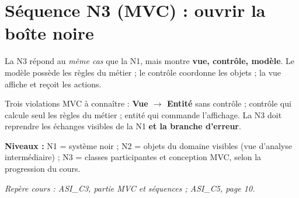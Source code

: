 \documentclass[10pt,a4paper]{article}
\newcommand{\source}[1]{\par{\footnotesize\color{bodygray}\textit{Repère cours : #1}}}
\begin{document}
\section{Séquence N3 (MVC) : ouvrir la boîte noire}
La N3 répond au \emph{même cas} que la N1, mais montre \textbf{vue, contrôle, modèle}. Le modèle possède les règles du métier ; le contrôle coordonne les objets ; la vue affiche et reçoit les actions.
\begin{center}
\end{center}
\begin{warningbox}
Trois violations MVC à connaître : \textbf{Vue \(\rightarrow\) Entité} sans contrôle ; contrôle qui calcule seul les règles du métier ; entité qui commande l'affichage. La N3 doit reprendre les échanges visibles de la N1 \textbf{et la branche d'erreur}.
\end{warningbox}
\textbf{Niveaux :} N1 = système noir ; N2 = objets du domaine visibles (vue d'analyse intermédiaire) ; N3 = classes participantes et conception MVC, selon la progression du cours.
\source{ASI\_C3, partie MVC et séquences ; ASI\_C5, page 10.}
\end{document}

